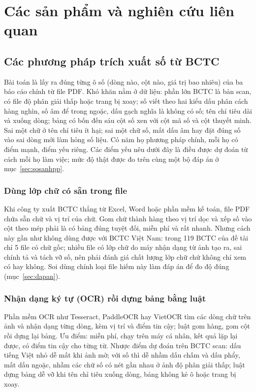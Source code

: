 \documentclass[12pt,a4paper]{report}
\begin{document}
\chapter{Các sản phẩm và nghiên cứu liên quan}\label{chap:lienquan}

\section{Các phương pháp trích xuất số từ BCTC}\label{sec:phuongphap}
Bài toán là lấy ra đúng từng ô số (dòng nào, cột nào, giá trị bao nhiêu) của ba báo cáo chính từ file PDF. Khó khăn nằm
ở dữ liệu: phần lớn BCTC là bản scan, có file độ phân giải thấp hoặc trang bị xoay; số viết theo hai kiểu dấu phân cách
hàng nghìn, số âm để trong ngoặc, dấu gạch nghĩa là không có số; tên chỉ tiêu dài và xuống dòng; bảng có bốn đến sáu cột
số xen với cột mã số và cột thuyết minh. Sai một chữ ở tên chỉ tiêu ít hại; sai một chữ số, mất dấu âm hay đặt đúng số
vào sai dòng mới làm hỏng số liệu. Có năm họ phương pháp chính, mỗi họ có điểm mạnh, điểm yếu riêng. Các điểm yếu nêu
dưới đây là điều được dự đoán từ cách mỗi họ làm việc; mức độ thật được đo trên cùng một bộ đáp án ở
mục~\ref{sec:sosanhpp}.

\subsection{Dùng lớp chữ có sẵn trong file}
Khi công ty xuất BCTC thẳng từ Excel, Word hoặc phần mềm kế toán, file PDF chứa sẵn chữ và vị trí của chữ. Gom chữ thành
hàng theo vị trí dọc và xếp số vào cột theo mép phải là có bảng đúng tuyệt đối, miễn phí và rất nhanh. Nhưng cách này gần
như không dùng được với BCTC Việt Nam: trong 119 BCTC của đề tài chỉ 5 file có chữ gốc; nhiều file có lớp chữ do máy nhận
dạng từ ảnh tạo ra, sai chính tả và tách vỡ số, nên phải đánh giá chất lượng lớp chữ chứ không chỉ xem có hay không. Soi
dùng chính loại file hiếm này làm đáp án để đo độ đúng (mục~\ref{sec:dapan}).

\subsection{Nhận dạng ký tự (OCR) rồi dựng bảng bằng luật}
Phần mềm OCR như Tesseract, PaddleOCR hay VietOCR tìm các dòng chữ trên ảnh và nhận dạng từng dòng, kèm vị trí và điểm tin
cậy; luật gom hàng, gom cột rồi dựng lại bảng. Ưu điểm: miễn phí, chạy trên máy cá nhân, kết quả lặp lại được, có điểm
tin cậy cho từng từ. Nhược điểm dự đoán trên BCTC scan: dấu tiếng Việt nhỏ dễ mất khi ảnh mờ; với số thì dễ nhầm dấu chấm
và dấu phẩy, mất dấu ngoặc, nhầm các chữ số có nét gần nhau ở ảnh độ phân giải thấp; luật dựng bảng dễ vỡ khi tên chỉ tiêu
xuống dòng, bảng không kẻ ô hoặc trang bị xoay.
\end{document}
